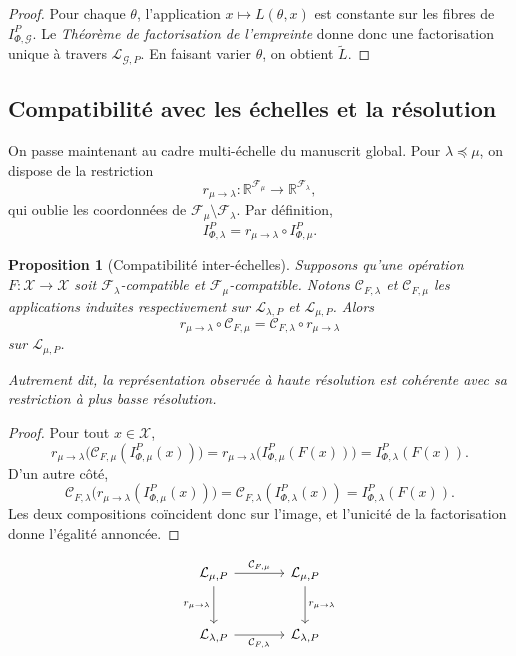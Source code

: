 \documentclass[11pt,a4paper]{article}
\newtheorem{proposition}{Proposition}
\begin{document}
\begin{appendices}
\begin{proof}
Pour chaque \(\theta\), l'application \(x\mapsto L(\theta,x)\) est constante sur les fibres de \(I_{\Phi,\mathcal G}^P\). Le \emph{Théorème de factorisation de l'empreinte} donne donc une factorisation unique à travers \(\mathcal L_{\mathcal G,P}\). En faisant varier \(\theta\), on obtient \(\widetilde L\).
\end{proof}

\subsection{Compatibilité avec les échelles et la résolution}

On passe maintenant au cadre multi-échelle du manuscrit global. Pour \(\lambda\preceq\mu\), on dispose de la restriction
\[
r_{\mu\to\lambda}:\mathbb R^{\mathcal F_\mu}\longrightarrow \mathbb R^{\mathcal F_\lambda},
\]
qui oublie les coordonnées de \(\mathcal F_\mu\setminus\mathcal F_\lambda\). Par définition,
\[
I_{\Phi,\lambda}^P=r_{\mu\to\lambda}\circ I_{\Phi,\mu}^P.
\]

\begin{proposition}[Compatibilité inter-échelles]
\label{prop:inter-echelles}
Supposons qu'une opération \(F:\mathcal X\to\mathcal X\) soit \(\mathcal F_\lambda\)-compatible et \(\mathcal F_\mu\)-compatible. Notons \(\mathcal C_{F,\lambda}\) et \(\mathcal C_{F,\mu}\) les applications induites respectivement sur \(\mathcal L_{\lambda,P}\) et \(\mathcal L_{\mu,P}\). Alors
\[
r_{\mu\to\lambda}\circ \mathcal C_{F,\mu}
=
\mathcal C_{F,\lambda}\circ r_{\mu\to\lambda}
\]
sur \(\mathcal L_{\mu,P}\).

Autrement dit, la représentation observée à haute résolution est cohérente avec sa restriction à plus basse résolution.
\end{proposition}

\begin{proof}
Pour tout \(x\in\mathcal X\),
\[
r_{\mu\to\lambda}\bigl(\mathcal C_{F,\mu}(I_{\Phi,\mu}^P(x))\bigr)
=
r_{\mu\to\lambda}\bigl(I_{\Phi,\mu}^P(F(x))\bigr)
=
I_{\Phi,\lambda}^P(F(x)).
\]
D'un autre côté,
\[
\mathcal C_{F,\lambda}\bigl(r_{\mu\to\lambda}(I_{\Phi,\mu}^P(x))\bigr)
=
\mathcal C_{F,\lambda}(I_{\Phi,\lambda}^P(x))
=
I_{\Phi,\lambda}^P(F(x)).
\]
Les deux compositions coïncident donc sur l'image, et l'unicité de la factorisation donne l'égalité annoncée.
\end{proof}

\begin{center}
\[
\begin{tikzcd}[column sep=large,row sep=large]
\mathcal L_{\mu,P} \arrow[r,"\mathcal C_{F,\mu}"] \arrow[d,"r_{\mu\to\lambda}"'] &
\mathcal L_{\mu,P} \arrow[d,"r_{\mu\to\lambda}"] \\
\mathcal L_{\lambda,P} \arrow[r,"\mathcal C_{F,\lambda}"'] &
\mathcal L_{\lambda,P}
\end{tikzcd}
\]
\end{center}


\end{appendices}
\end{document}
